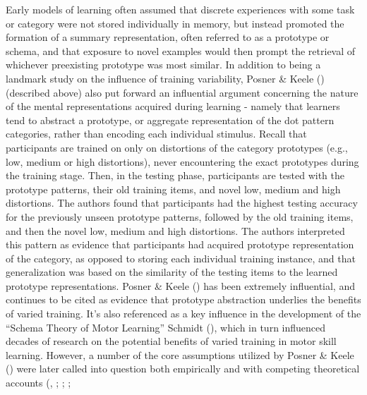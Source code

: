 \documentclass[
  11pt,
  letterpaper,
]{article}
\begin{document}
Early models of learning often assumed that discrete experiences with
some task or category were not stored individually in memory, but
instead promoted the formation of a summary representation, often
referred to as a prototype or schema, and that exposure to novel
examples would then prompt the retrieval of whichever preexisting
prototype was most similar. In addition to being a landmark study on the
influence of training variability, Posner \& Keele
() (described above)
also put forward an influential argument concerning the nature of the
mental representations acquired during learning - namely that learners
tend to abstract a prototype, or aggregate representation of the dot
pattern categories, rather than encoding each individual stimulus.
Recall that participants are trained on only on distortions of the
category prototypes (e.g., low, medium or high distortions), never
encountering the exact prototypes during the training stage. Then, in
the testing phase, participants are tested with the prototype patterns,
their old training items, and novel low, medium and high distortions.
The authors found that participants had the highest testing accuracy for
the previously unseen prototype patterns, followed by the old training
items, and then the novel low, medium and high distortions. The authors
interpreted this pattern as evidence that participants had acquired
prototype representation of the category, as opposed to storing each
individual training instance, and that generalization was based on the
similarity of the testing items to the learned prototype
representations. Posner \& Keele
() has been extremely
influential, and continues to be cited as evidence that prototype
abstraction underlies the benefits of varied training. It's also
referenced as a key influence in the development of the ``Schema Theory
of Motor Learning'' Schmidt
(), which in turn
influenced decades of research on the potential benefits of varied
training in motor skill learning. However, a number of the core
assumptions utilized by Posner \& Keele
() were later called
into question both empirically and with competing theoretical accounts
(,
;
;
;
\end{document}
